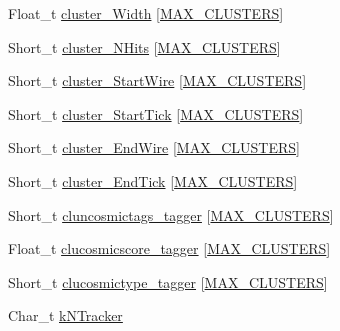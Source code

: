 \begin{DoxyCompactItemize}
Float\-\_\-t \hyperlink{classanatree_a9240388979e46e4338b8f4a819ea34ff}{cluster\-\_\-\-Width} \mbox{[}\hyperlink{anatree__core__v09410002__orig_8h_a7250daa0fff832693cecd6907e64f6ec}{M\-A\-X\-\_\-\-C\-L\-U\-S\-T\-E\-R\-S}\mbox{]}
\item 
Short\-\_\-t \hyperlink{classanatree_ae64b28cc588826048d6665ca84e0b7da}{cluster\-\_\-\-N\-Hits} \mbox{[}\hyperlink{anatree__core__v09410002__orig_8h_a7250daa0fff832693cecd6907e64f6ec}{M\-A\-X\-\_\-\-C\-L\-U\-S\-T\-E\-R\-S}\mbox{]}
\item 
Short\-\_\-t \hyperlink{classanatree_a182c7fb3a2086ad0373d522e931f82c7}{cluster\-\_\-\-Start\-Wire} \mbox{[}\hyperlink{anatree__core__v09410002__orig_8h_a7250daa0fff832693cecd6907e64f6ec}{M\-A\-X\-\_\-\-C\-L\-U\-S\-T\-E\-R\-S}\mbox{]}
\item 
Short\-\_\-t \hyperlink{classanatree_a401ba755fe4050cb3fdd2c432374abb5}{cluster\-\_\-\-Start\-Tick} \mbox{[}\hyperlink{anatree__core__v09410002__orig_8h_a7250daa0fff832693cecd6907e64f6ec}{M\-A\-X\-\_\-\-C\-L\-U\-S\-T\-E\-R\-S}\mbox{]}
\item 
Short\-\_\-t \hyperlink{classanatree_a44f1514692e996efab1aa5e025540ff3}{cluster\-\_\-\-End\-Wire} \mbox{[}\hyperlink{anatree__core__v09410002__orig_8h_a7250daa0fff832693cecd6907e64f6ec}{M\-A\-X\-\_\-\-C\-L\-U\-S\-T\-E\-R\-S}\mbox{]}
\item 
Short\-\_\-t \hyperlink{classanatree_a43b238c8923fbf44a4e02c6c615ba82e}{cluster\-\_\-\-End\-Tick} \mbox{[}\hyperlink{anatree__core__v09410002__orig_8h_a7250daa0fff832693cecd6907e64f6ec}{M\-A\-X\-\_\-\-C\-L\-U\-S\-T\-E\-R\-S}\mbox{]}
\item 
Short\-\_\-t \hyperlink{classanatree_a9c829d190955933229088e452846ea7b}{cluncosmictags\-\_\-tagger} \mbox{[}\hyperlink{anatree__core__v09410002__orig_8h_a7250daa0fff832693cecd6907e64f6ec}{M\-A\-X\-\_\-\-C\-L\-U\-S\-T\-E\-R\-S}\mbox{]}
\item 
Float\-\_\-t \hyperlink{classanatree_a0ffbb34cd1be47925f21fe56c6d3a9e4}{clucosmicscore\-\_\-tagger} \mbox{[}\hyperlink{anatree__core__v09410002__orig_8h_a7250daa0fff832693cecd6907e64f6ec}{M\-A\-X\-\_\-\-C\-L\-U\-S\-T\-E\-R\-S}\mbox{]}
\item 
Short\-\_\-t \hyperlink{classanatree_ae283ea887bcf0e7daafd4b4966caa63b}{clucosmictype\-\_\-tagger} \mbox{[}\hyperlink{anatree__core__v09410002__orig_8h_a7250daa0fff832693cecd6907e64f6ec}{M\-A\-X\-\_\-\-C\-L\-U\-S\-T\-E\-R\-S}\mbox{]}
\item 
Char\-\_\-t \hyperlink{classanatree_a264df42fa5b588baa256455dbb47c3bc}{k\-N\-Tracker}

\end{DoxyCompactItemize}
